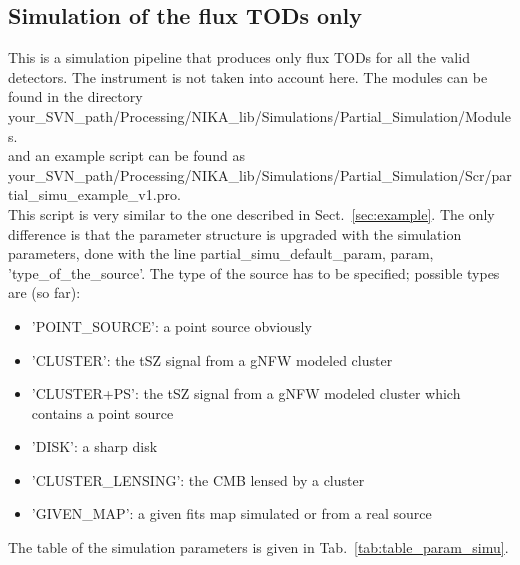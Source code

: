 \documentclass[a4paper]{article}
\begin{document}
\subsection{Simulation of the flux TODs only}
This is a simulation pipeline that produces only flux TODs for all the valid detectors. The instrument is not taken into account here. The modules can be found in the directory \\
{\color{blue} your\_SVN\_path/Processing/NIKA\_lib/Simulations/Partial\_Simulation/Modules}. \\
and an example script can be found as \\
{\color{blue} your\_SVN\_path/Processing/NIKA\_lib/Simulations/Partial\_Simulation/Scr/partial\_simu\_example\_v1.pro}.\\
This script is very similar to the one described in Sect.~\ref{sec:example}. The only difference is that the parameter structure is upgraded with the simulation parameters, done with the line {\color{blue} partial\_simu\_default\_param, param, 'type\_of\_the\_source'}. The type of the source has to be specified; possible types are (so far):
\begin{itemize}
\item {\color{blue} 'POINT\_SOURCE'}: a point source obviously
\item {\color{blue} 'CLUSTER'}: the tSZ signal from a gNFW modeled cluster
\item {\color{blue} 'CLUSTER+PS'}: the tSZ signal from a gNFW modeled cluster which contains a point source
\item {\color{blue} 'DISK'}: a sharp disk
\item {\color{blue} 'CLUSTER\_LENSING'}: the CMB lensed by a cluster
\item {\color{blue} 'GIVEN\_MAP'}: a given fits map simulated or from a real source
\end{itemize}
The table of the simulation parameters is given in Tab.~\ref{tab:table_param_simu}.
\end{document}
